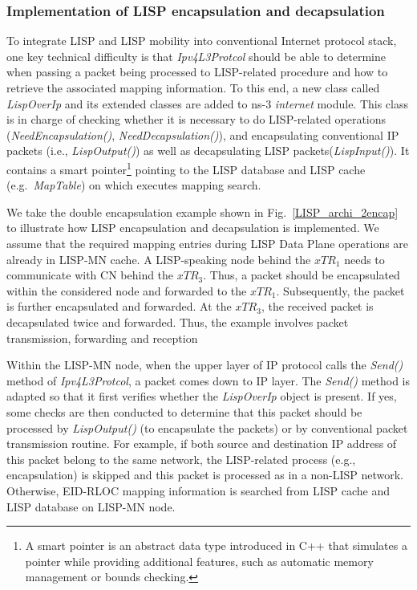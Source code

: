 \subsubsection{Implementation of LISP encapsulation and decapsulation}
To integrate LISP and LISP mobility into conventional Internet protocol stack, one key technical difficulty is that \emph{Ipv4L3Protcol} should be able to determine when passing a packet being processed to LISP-related procedure and how to retrieve the associated mapping information. To this end, a new class called \emph{LispOverIp} and its extended classes 
are added to ns-3 \emph{internet} module. This class is in charge of checking whether it is necessary to do LISP-related operations (\emph{NeedEncapsulation()}, \emph{NeedDecapsulation()}), and encapsulating conventional IP packets (i.e., \emph{LispOutput()}) as well as decapsulating LISP packets(\emph{LispInput()}). It contains a smart pointer\footnote{A smart pointer is an abstract data type introduced in C++ that simulates a pointer while providing additional features, such as automatic memory management or bounds checking.} pointing to the LISP database and LISP cache (e.g.~\emph{MapTable}) on which executes mapping search.

We take the double encapsulation example shown in Fig.~\ref{LISP_archi_2encap} to illustrate how LISP encapsulation and decapsulation is implemented. We assume that the required mapping entries during LISP Data Plane operations are already in LISP-MN cache. A LISP-speaking node behind the $xTR_1$ needs to communicate with CN behind the $xTR_3$. Thus, a packet should be encapsulated within the considered node and forwarded to the $xTR_1$. Subsequently, the packet is further encapsulated and forwarded. At the $xTR_3$, %
the received packet is decapsulated twice and forwarded. Thus, the example involves packet transmission, forwarding and reception 

Within the LISP-MN node, when the upper layer of IP protocol calls the \emph{Send()} method of \emph{Ipv4L3Protcol}, a packet comes down to IP layer. The \emph{Send()} method is adapted so that it first verifies whether the \emph{LispOverIp} object is present. If yes, some checks are then conducted to determine that this packet should be processed by \emph{LispOutput()} (to encapsulate the packets) or by conventional packet transmission routine. For example, if both source and destination IP address of this packet belong to the same network, the LISP-related process (e.g., encapsulation) is skipped and this packet is processed as in a non-LISP network. Otherwise, EID-RLOC mapping information is searched from LISP cache and LISP database on LISP-MN node. 

